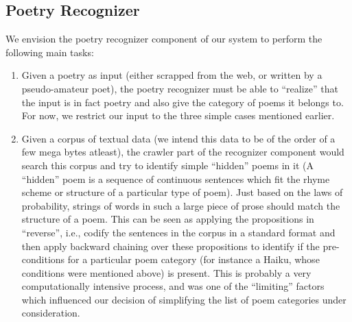 \documentclass[10pt, letter,twocolumn]{IEEEtran}
\begin{document}
\subsection*{Poetry Recognizer}
We envision the poetry recognizer component of our system to perform the following main tasks:
\begin{enumerate}
	\item Given a poetry as input (either scrapped from the web, or written by a pseudo-amateur poet), the poetry recognizer must be able to ``realize'' that the input is in fact poetry and also give the category of poems it belongs to. For now, we restrict our input to the three simple cases mentioned earlier.
	\item Given a corpus of textual data (we intend this data to be of the order of a few mega bytes atleast), the crawler part of the recognizer component would search this corpus and try to identify simple ``hidden'' poems in it (A ``hidden'' poem is a sequence of continuous sentences which fit the rhyme scheme or structure of a particular type of poem). Just based on the laws of probability, strings of words in such a large piece of prose should match the structure of a poem. This can be seen as applying the propositions in ``reverse'', i.e., codify the sentences in the corpus in a standard format and then apply backward chaining over these propositions to identify if the pre-conditions for a particular poem category (for instance a Haiku, whose conditions were mentioned above) is present. This is probably a very computationally intensive process, and was one of the ``limiting'' factors which influenced our decision of simplifying the list of poem categories under consideration.
\end{enumerate}
\end{document}

